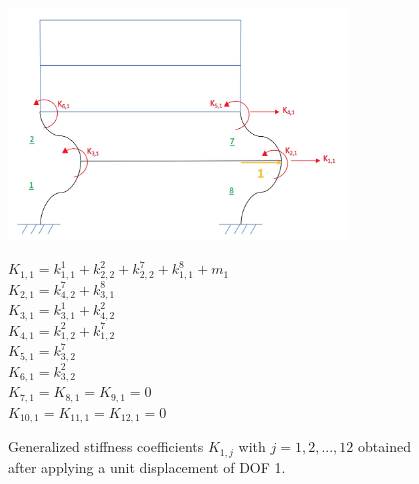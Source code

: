 \documentclass[11pt,a4paper,titlepage]{report}
\begin{document}
\begin{figure} [h]
\begin{minipage}{0.59\linewidth}
        \centering
         \includegraphics[width=9cm]{U=1.jpeg}
\end{minipage}
\begin{minipage}{0.4\linewidth}
\begin{small}
            $K_{1,1} = k^1_{1,1}+k^2_{2,2}+k^7_{2,2}+k^8_{1,1}+m_1$\\
            $K_{2,1} = k^7_{4,2}+k^8_{3,1}$\\
            $K_{3,1} = k^1_{3,1}+k^2_{4,2}$\\
            $K_{4,1} = k^2_{1,2}+k^7_{1,2}$\\
            $K_{5,1} = k^7_{3,2}$\\
            $K_{6,1} = k^2_{3,2}$\\
            $K_{7,1} = K_{8,1}=K_{9,1}=0$\\
            $K_{10,1}=K_{11,1}=K_{12,1}= 0$\\
\end{small}
\end{minipage}
\caption{Generalized stiffness coefficients $K_{1,j}$ with $j=1,2,...,12$ obtained after applying a unit displacement of DOF 1.}
\label{fig: I.1 - u1=1}
\end{figure}
\end{document}
